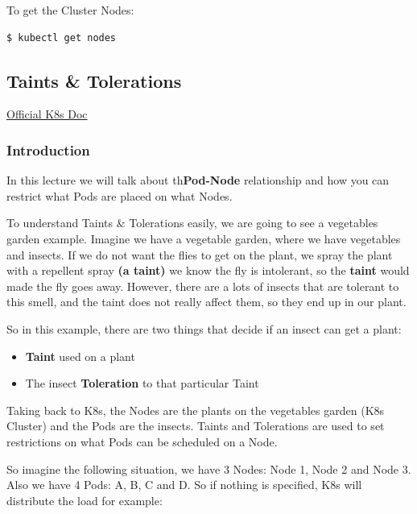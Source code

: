 \documentclass{article}
\newenvironment{codetemplate}[1][]{%
  \mybasecolorbox[#1]
  \itshape
}{%
  \endmybasecolorbox
}
\begin{document}
To get the Cluster Nodes:

\begin{codetemplate}{}
\begin{verbatim}
$ kubectl get nodes
\end{verbatim}
\end{codetemplate}

\subsection{Taints \& Tolerations}

\href{https://kubernetes.io/docs/concepts/scheduling-eviction/taint-and-toleration/}{Official K8s Doc}

\subsubsection{Introduction}

In this lecture we will talk about th\textbf{Pod-Node} relationship and how you can restrict what Pods are placed on what Nodes. 

To understand Taints \& Tolerations easily, we are going to see a vegetables garden example. Imagine we have a vegetable garden, where we have vegetables and insects. If we do not want the flies to get on the plant, we spray the plant with a repellent spray \textbf{(a taint)} we know the fly is intolerant, so the \textbf{taint} would made the fly goes away. However, there are a lots of insects that are tolerant to this smell, and the taint does not really affect them, so they end up in our plant.

So in this example, there are two things that decide if an insect can get a plant:

\begin{itemize}
    \item \textbf{Taint} used on a plant
    \item The insect \textbf{Toleration} to that particular Taint
\end{itemize}

Taking back to K8s, the Nodes are the plants on the vegetables garden (K8s Cluster) and the Pods are the insects. Taints and Tolerations are used to set restrictions on what Pods can be scheduled on a Node.

So imagine the following situation, we have 3 Nodes: Node 1, Node 2 and Node 3. Also we have 4 Pods: A, B, C and D. So if nothing is specified, K8s will distribute the load for example:
\end{document}
